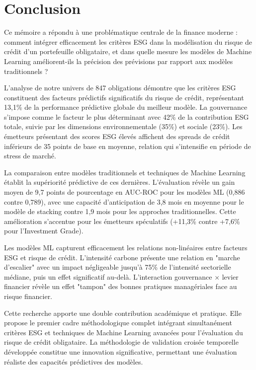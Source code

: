 \chapter{Conclusion}

Ce mémoire a répondu à une problématique centrale de la finance moderne : comment intégrer efficacement les critères ESG dans la modélisation du risque de crédit d'un portefeuille obligataire, et dans quelle mesure les modèles de Machine Learning améliorent-ils la précision des prévisions par rapport aux modèles traditionnels ?

L'analyse de notre univers de 847 obligations démontre que les critères ESG constituent des facteurs prédictifs significatifs du risque de crédit, représentant 13,1\% de la performance prédictive globale du meilleur modèle. La gouvernance s'impose comme le facteur le plus déterminant avec 42\% de la contribution ESG totale, suivie par les dimensions environnementale (35\%) et sociale (23\%). Les émetteurs présentant des scores ESG élevés affichent des spreads de crédit inférieurs de 35 points de base en moyenne, relation qui s'intensifie en période de stress de marché.

La comparaison entre modèles traditionnels et techniques de Machine Learning établit la supériorité prédictive de ces dernières. L'évaluation révèle un gain moyen de 9,7 points de pourcentage en AUC-ROC pour les modèles ML (0,886 contre 0,789), avec une capacité d'anticipation de 3,8 mois en moyenne pour le modèle de stacking contre 1,9 mois pour les approches traditionnelles. Cette amélioration s'accentue pour les émetteurs spéculatifs (+11,3\% contre +7,6\% pour l'Investment Grade).

Les modèles ML capturent efficacement les relations non-linéaires entre facteurs ESG et risque de crédit. L'intensité carbone présente une relation en "marche d'escalier" avec un impact négligeable jusqu'à 75\% de l'intensité sectorielle médiane, puis un effet significatif au-delà. L'interaction gouvernance × levier financier révèle un effet "tampon" des bonnes pratiques managériales face au risque financier.

Cette recherche apporte une double contribution académique et pratique. Elle propose le premier cadre méthodologique complet intégrant simultanément critères ESG et techniques de Machine Learning avancées pour l'évaluation du risque de crédit obligataire. La méthodologie de validation croisée temporelle développée constitue une innovation significative, permettant une évaluation réaliste des capacités prédictives des modèles.

